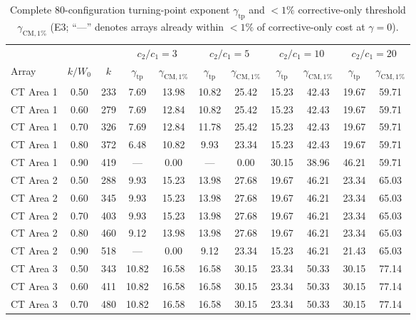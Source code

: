 \documentclass[10pt,a4paper]{article}
\begin{document}
\begin{table}[htbp]
\centering
\scriptsize
\caption{Complete 80-configuration turning-point exponent $\gamma_{\mathrm{tp}}$ and $<1\%$ corrective-only threshold $\gamma_{\mathrm{CM},1\%}$ (E3; ``---'' denotes arrays already within $<1\%$ of corrective-only cost at $\gamma = 0$).}
\label{tab:S6}
\begin{tabular*}{\textwidth}{@{\extracolsep{\fill}}lcc|cc|cc|cc|cc@{}}
\toprule
 & & & \multicolumn{2}{c|}{$c_2/c_1 = 3$} & \multicolumn{2}{c|}{$c_2/c_1 = 5$} & \multicolumn{2}{c|}{$c_2/c_1 = 10$} & \multicolumn{2}{c}{$c_2/c_1 = 20$} \\
Array & $k/W_0$ & $k$ & $\gamma_{\mathrm{tp}}$ & $\gamma_{\mathrm{CM},1\%}$ & $\gamma_{\mathrm{tp}}$ & $\gamma_{\mathrm{CM},1\%}$ & $\gamma_{\mathrm{tp}}$ & $\gamma_{\mathrm{CM},1\%}$ & $\gamma_{\mathrm{tp}}$ & $\gamma_{\mathrm{CM},1\%}$ \\
\midrule
CT Area 1 & 0.50 & 233 & 7.69 & 13.98 & 10.82 & 25.42 & 15.23 & 42.43 & 19.67 & 59.71 \\
CT Area 1 & 0.60 & 279 & 7.69 & 12.84 & 10.82 & 25.42 & 15.23 & 42.43 & 19.67 & 59.71 \\
CT Area 1 & 0.70 & 326 & 7.69 & 12.84 & 11.78 & 25.42 & 15.23 & 42.43 & 19.67 & 59.71 \\
CT Area 1 & 0.80 & 372 & 6.48 & 10.82 & 9.93 & 23.34 & 15.23 & 42.43 & 19.67 & 59.71 \\
CT Area 1 & 0.90 & 419 & --- & 0.00 & --- & 0.00 & 30.15 & 38.96 & 46.21 & 59.71 \\
\midrule
CT Area 2 & 0.50 & 288 & 9.93 & 15.23 & 13.98 & 27.68 & 19.67 & 46.21 & 23.34 & 65.03 \\
CT Area 2 & 0.60 & 345 & 9.93 & 15.23 & 13.98 & 27.68 & 19.67 & 46.21 & 23.34 & 65.03 \\
CT Area 2 & 0.70 & 403 & 9.93 & 15.23 & 13.98 & 27.68 & 19.67 & 46.21 & 23.34 & 65.03 \\
CT Area 2 & 0.80 & 460 & 9.12 & 13.98 & 13.98 & 27.68 & 19.67 & 46.21 & 23.34 & 65.03 \\
CT Area 2 & 0.90 & 518 & --- & 0.00 & 9.12 & 23.34 & 15.23 & 46.21 & 21.43 & 65.03 \\
\midrule
CT Area 3 & 0.50 & 343 & 10.82 & 16.58 & 16.58 & 30.15 & 23.34 & 50.33 & 30.15 & 77.14 \\
CT Area 3 & 0.60 & 411 & 10.82 & 16.58 & 16.58 & 30.15 & 23.34 & 50.33 & 30.15 & 77.14 \\
CT Area 3 & 0.70 & 480 & 10.82 & 16.58 & 16.58 & 30.15 & 23.34 & 50.33 & 30.15 & 77.14 \\

\end{tabular*}
\end{table}
\end{document}
